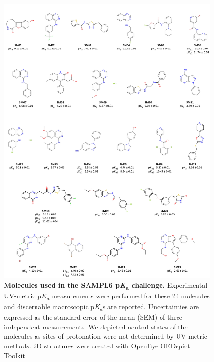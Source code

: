 \documentclass[9pt,lineno]{elife}
\newcommand{\pKa}{p\textit{K}\textsubscript{a}}
\begin{document}
\begin{figure}
\includegraphics[width=1.00\linewidth]{figures/SAMPL6_pKa_molecules_fig}
\caption{{\bf Molecules used in the SAMPL6 \pKa{} challenge.} 
Experimental UV-metric \pKa{} measurements were performed for these 24 molecules and discernable macroscopic \pKa{}s are reported. 
Uncertainties are expressed as the standard error of the mean (SEM) of three independent measurements. We depicted neutral states of the molecules as sites of protonation were not determined by UV-metric methods.
2D structures were created with OpenEye OEDepict Toolkit~\citep{oedepict_openeye_2017}
}
\label{fig:pKa_molecules}
\end{figure}
\end{document}

